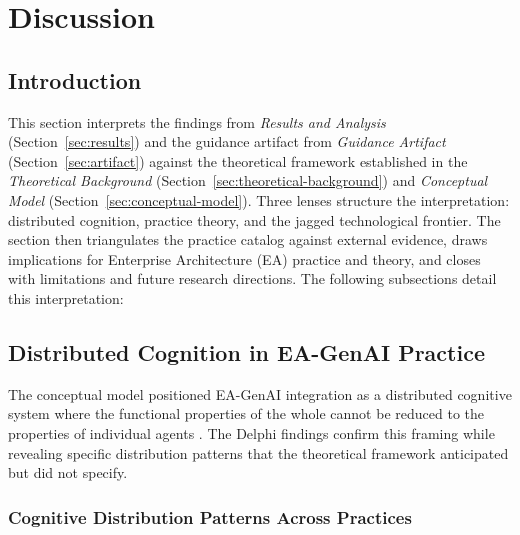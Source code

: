 
\section{Discussion}\label{sec:discussion}

\subsection*{Introduction}

This section interprets the findings from \textit{Results and Analysis} (Section~\ref{sec:results}) and the
guidance artifact from \textit{Guidance Artifact} (Section~\ref{sec:artifact}) against the theoretical
framework established in the \textit{Theoretical Background} (Section~\ref{sec:theoretical-background})
and \textit{Conceptual Model} (Section~\ref{sec:conceptual-model}). Three lenses structure the interpretation:
distributed cognition, practice theory, and the jagged technological frontier.
The section then triangulates the practice catalog against external evidence,
draws implications for Enterprise Architecture (EA) practice and theory, and
closes with limitations and future research directions. The following
subsections detail this interpretation:

\localtableofcontents\clearpage

\subsection{Distributed Cognition in EA-GenAI Practice}\label{subsec:disc-dcog}

The conceptual model positioned EA-GenAI integration as a distributed cognitive
system where the functional properties of the whole cannot be reduced to the
properties of individual agents \parencite{hutchins_cognition_1995}. The
Delphi findings confirm this
framing while revealing specific distribution patterns that the theoretical
framework anticipated but did not specify.

\subsubsection{Cognitive Distribution Patterns Across Practices}

